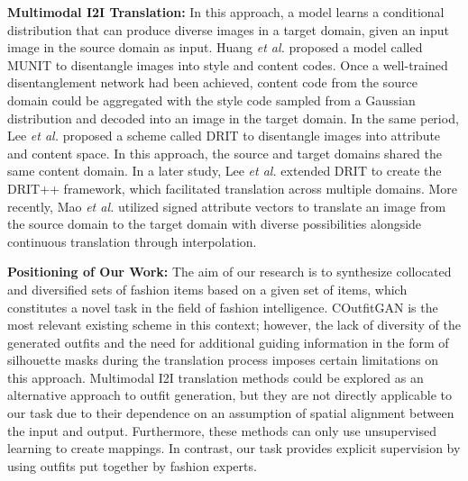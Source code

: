 	\textbf{Multimodal I2I Translation:} In this approach, a model learns a conditional distribution that can produce diverse images in a target domain, given an input image in the source domain as input. Huang \textit{et al.} \cite{huang2018munit} proposed a model called MUNIT to disentangle images into style and content codes. Once a well-trained disentanglement network had been achieved, content code from the source domain could be aggregated with the style code sampled from a Gaussian distribution and decoded into an image in the target domain. In the same period, Lee \textit{et al.} \cite{DRIT} proposed a scheme called DRIT to disentangle images into attribute and content space. In this approach, the source and target domains shared the same content domain. In a later study, Lee \textit{et al.} \cite{DRIT_plus} extended DRIT to create the DRIT++ framework, which facilitated translation across multiple domains. More recently, Mao \textit{et al.} \cite{mao2022continuous} utilized signed attribute vectors to translate an image from the source domain to the target domain with diverse possibilities alongside continuous translation through interpolation.
	
	\textbf{Positioning of Our Work:} The aim of our research is to synthesize collocated and diversified sets of fashion items based on a given set of items, which constitutes a novel task in the field of fashion intelligence. COutfitGAN \cite{zhou2022coutfitgan} is the most relevant existing scheme in this context; however, the lack of diversity of the generated outfits and the need for additional guiding information in the form of silhouette masks during the translation process imposes certain limitations on this approach. Multimodal I2I translation methods \cite{huang2018munit, DRIT, DRIT_plus, mao2022continuous} could be explored as an alternative approach to outfit generation, but they are not directly applicable to our task due to their dependence on an assumption of spatial alignment between the input and output. Furthermore, these methods can only use unsupervised learning to create mappings. In contrast, our task provides explicit supervision by using outfits put together by fashion experts.